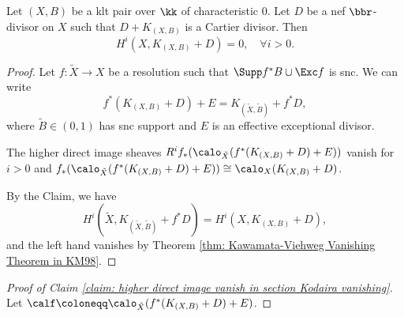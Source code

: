     \begin{theorem}\label{thm: Kodaira Vanishing Theorem for klt pair}
        Let \((X,B)\) be a klt pair over \(\kk\) of characteristic \(0\).
        Let \(D\) be a nef \(\bbr\)-divisor on \(X\) such that \(D + K_{(X,B)}\) is a Cartier divisor.
        Then
        \[ H^i(X, K_{(X,B)} + D) = 0,\quad \forall i > 0. \]
    \end{theorem}
    \begin{proof}
        Let \(f: \tilde{X} \to X\) be a resolution such that \(\Supp f^*B \cup \Exc f\) is snc.
        We can write
        \[ f^*(K_{(X,B)} + D) + E = K_{(\tilde{X},\tilde{B})} + f^*D, \]
        where \(\tilde{B} \in (0,1)\) has snc support and \(E\) is an effective exceptional divisor.

        \begin{claim}\label{claim: higher direct image vanish in section Kodaira vanishing}
            The higher direct image sheaves \(R^if_*(\calo_{\tilde{X}}(f^*(K_{(X,B)} + D) + E))\) vanish for \(i > 0\) and \(f_*(\calo_{\tilde{X}}(f^*(K_{(X,B)} + D) + E)) \cong \calo_X(K_{(X,B)}+D)\).
        \end{claim}

        By the Claim, we have 
        \[ H^i(\tilde{X}, K_{(\tilde{X},\tilde{B})} + f^*D) = H^i(X, K_{(X,B)}+D), \] 
        and the left hand vanishes by Theorem \ref{thm: Kawamata-Viehweg Vanishing Theorem in KM98}.
    \end{proof}
    \begin{proof}[Proof of Claim \ref{claim: higher direct image vanish in section Kodaira vanishing}]
        Let \(\calf\coloneqq \calo_{\tilde{X}}(f^*(K_{(X,B)} + D) + E)\).
    \end{proof}